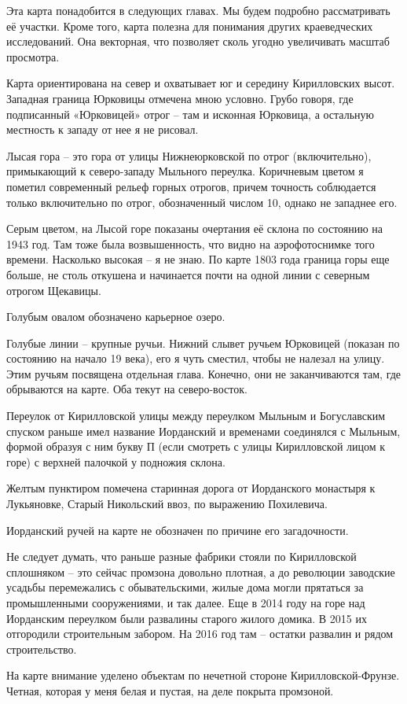 Эта карта понадобится в следующих главах. Мы будем подробно рассматривать её участки. Кроме того, карта полезна для понимания других краеведческих исследований. Она векторная, что позволяет сколь угодно увеличивать масштаб просмотра. 

Карта ориентирована на север и охватывает юг и середину Кирилловских высот. Западная граница Юрковицы отмечена мною условно. Грубо говоря, где подписанный «Юрковицей» отрог – там и исконная Юрковица, а остальную местность к западу от нее я не рисовал.

Лысая гора – это гора от улицы Нижнеюрковской по отрог (включительно), примыкающий к северо-западу Мыльного переулка. Коричневым цветом я пометил современный рельеф горных отрогов, причем точность соблюдается только включительно по отрог, обозначенный числом 10, однако не западнее его.

Серым цветом, на Лысой горе показаны очертания её склона по состоянию на 1943 год. Там тоже была возвышенность, что видно на аэрофотоснимке того времени. Насколько высокая – я не знаю. По карте 1803 года граница горы еще больше, не столь откушена и начинается почти на одной линии с северным отрогом Щекавицы.

Голубым овалом обозначено карьерное озеро.

Голубые линии – крупные ручьи. Нижний слывет ручьем Юрковицей (показан по состоянию на начало 19 века), его я чуть сместил, чтобы не налезал на улицу. Этим ручьям посвящена отдельная глава. Конечно, они не заканчиваются там, где обрываются на карте. Оба текут на северо-восток.
 
Переулок от Кирилловской улицы между переулком Мыльным и Богуславским спуском раньше имел название Иорданский и временами соединялся с Мыльным, формой образуя с ним букву П (если смотреть с улицы Кирилловской лицом к горе) с верхней палочкой у подножия склона.

Желтым пунктиром помечена старинная дорога от Иорданского монастыря к Лукьяновке, Старый Никольский ввоз, по выражению Похилевича.

Иорданский ручей на карте не обозначен по причине его загадочности.

Не следует думать, что раньше разные фабрики стояли по Кирилловской сплошняком – это сейчас промзона довольно плотная, а до революции заводские усадьбы перемежались с обывательскими, жилые дома могли прятаться за промышленными сооружениями, и так далее. Еще в 2014 году на горе над Иорданским переулком были развалины старого жилого домика. В 2015 их отгородили строительным забором. На 2016 год там – остатки развалин и рядом строительство.

На карте внимание уделено объектам по нечетной стороне Кирилловской-Фрунзе. Четная, которая у меня белая и пустая, на деле покрыта промзоной.
